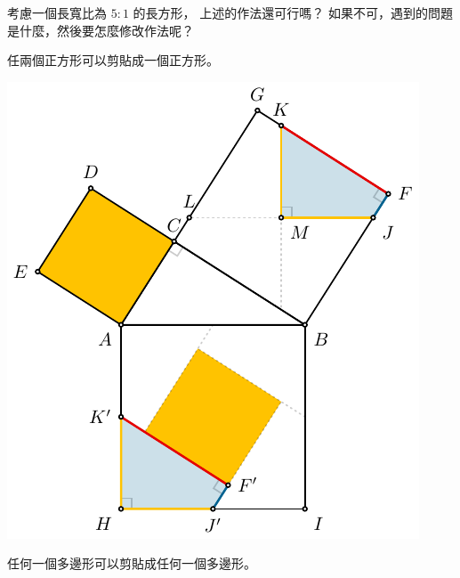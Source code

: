 \documentclass{article}
\begin{document}
\begin{multicols*}{2}
\begin{remark}
	考慮一個長寬比為 $5:1$ 的長方形，
	上述的作法還可行嗎？
	如果不可，遇到的問題是什麼，然後要怎麼修改作法呢？
\end{remark}

\begin{theorem}
	任兩個正方形可以剪貼成一個正方形。
\end{theorem}

\begin{center}
	\includegraphics[scale=1]{figures/figure-pythagorean.pdf}
\end{center}

\begin{theorem}
	任何一個多邊形可以剪貼成任何一個多邊形。
\end{theorem}

\vfill\hfill{}

\end{multicols*}
\end{document}
